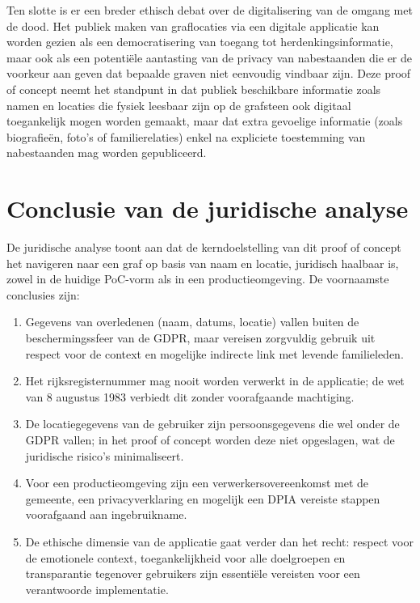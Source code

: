 Ten slotte is er een breder ethisch debat over de digitalisering van de omgang met de dood. Het publiek maken van graflocaties via een digitale applicatie kan worden gezien als een democratisering van toegang tot herdenkingsinformatie, maar ook als een potentiële aantasting van de privacy van nabestaanden die er de voorkeur aan geven dat bepaalde graven niet eenvoudig vindbaar zijn. Deze proof of concept neemt het standpunt in dat publiek beschikbare informatie zoals namen en locaties die fysiek leesbaar zijn op de grafsteen ook digitaal toegankelijk mogen worden gemaakt, maar dat extra gevoelige informatie (zoals biografieën, foto's of familierelaties) enkel na expliciete toestemming van nabestaanden mag worden gepubliceerd.

\section{Conclusie van de juridische analyse}

De juridische analyse toont aan dat de kerndoelstelling van dit proof of concept  het navigeren naar een graf op basis van naam en locatie, juridisch haalbaar is, zowel in de huidige PoC-vorm als in een productieomgeving. De voornaamste conclusies zijn:

\begin{enumerate}
    \item Gegevens van overledenen (naam, datums, locatie) vallen buiten de beschermingssfeer van de GDPR, maar vereisen zorgvuldig gebruik uit respect voor de context en mogelijke indirecte link met levende familieleden.
    \item Het rijksregisternummer mag nooit worden verwerkt in de applicatie; de wet van 8 augustus 1983 verbiedt dit zonder voorafgaande machtiging.
    \item De locatiegegevens van de gebruiker zijn persoonsgegevens die wel onder de GDPR vallen; in het proof of concept worden deze niet opgeslagen, wat de juridische risico's minimaliseert.
    \item Voor een productieomgeving zijn een verwerkersovereenkomst met de gemeente, een privacyverklaring en mogelijk een DPIA vereiste stappen voorafgaand aan ingebruikname.
    \item De ethische dimensie van de applicatie gaat verder dan het recht: respect voor de emotionele context, toegankelijkheid voor alle doelgroepen en transparantie tegenover gebruikers zijn essentiële vereisten voor een verantwoorde implementatie.
\end{enumerate}